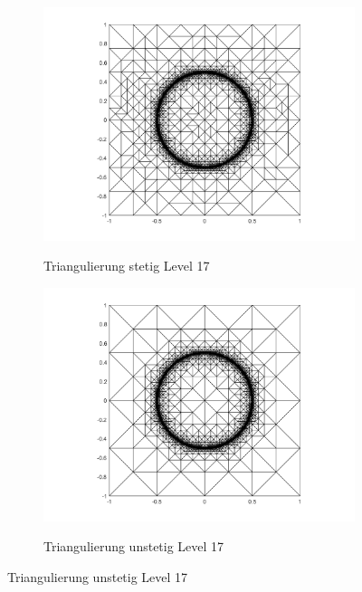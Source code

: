 \begin{figure}[p]
  \centering
  \begin{subfigure}[b]{.48\linewidth}
    \centering
    \caption{Triangulierung stetig Level 17}
    \includegraphics[trim = 100 30 80 20, clip, width=\linewidth]
      {pictures/chapExperiments/secGrayscale/circ/cont/adaptive/lvl17/triangulation.png}
    \label{fig:circContLvl17Triang}
  \end{subfigure}
  \quad
  \begin{subfigure}[b]{.48\linewidth}
    \centering
    \caption{Triangulierung unstetig Level 17}
    \includegraphics[trim = 100 30 80 20, clip, width=\linewidth]
      {pictures/chapExperiments/secGrayscale/circ/disc/adaptive/lvl17/triangulation.png}
    \label{fig:circDiscLvl17Triang}
  \end{subfigure}


\end{figure}
